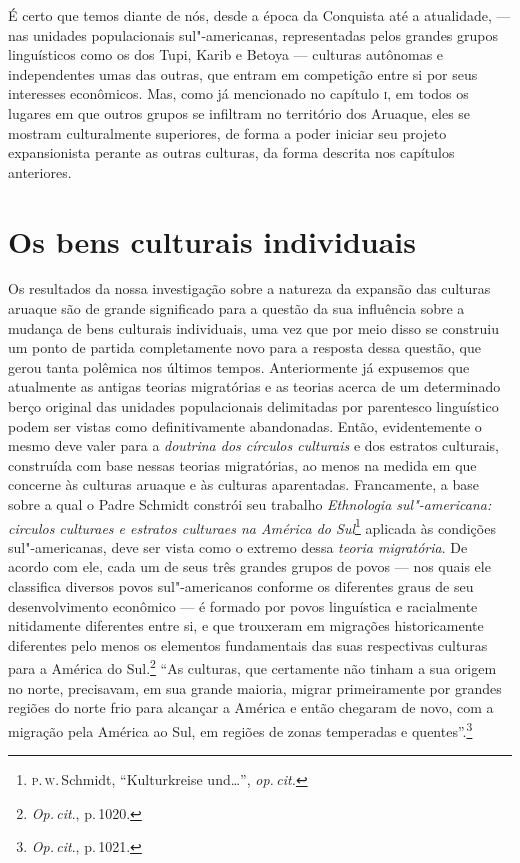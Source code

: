 É certo que temos diante de nós, desde a época da Conquista até a atualidade,
--- nas unidades populacionais sul"-americanas, representadas pelos
grandes grupos linguísticos como os dos Tupi, Karib e Betoya --- culturas
autônomas e independentes umas das outras, que entram em competição
entre si por seus interesses econômicos. Mas,
como já mencionado no capítulo \textsc{i}, em todos os lugares em que outros
grupos se infiltram no território dos Aruaque, eles se mostram
culturalmente superiores, de forma a poder iniciar seu projeto
expansionista perante as outras culturas, da forma descrita nos
capítulos anteriores.

\chapter*{Os bens culturais individuais\smallskip{}}


Os resultados da nossa investigação sobre a natureza da expansão das
culturas aruaque são de grande significado para a questão da sua
influência sobre a mudança de bens culturais individuais, uma vez que
por meio disso se construiu um ponto de partida completamente novo para
a resposta dessa questão, que gerou tanta polêmica nos últimos tempos.
Anteriormente já expusemos que atualmente as antigas teorias migratórias
e as teorias acerca de um determinado berço original das unidades
populacionais delimitadas por parentesco linguístico podem ser vistas
como definitivamente abandonadas. Então, evidentemente o mesmo deve
valer para a \textit{doutrina dos círculos culturais} e dos estratos culturais,
construída com base nessas teorias migratórias, ao menos na medida em
que concerne às culturas aruaque e às culturas aparentadas. Francamente,
a base sobre a qual o Padre Schmidt constrói seu trabalho \textit{Ethnologia sul"-americana: circulos
  culturaes e estratos culturaes na América do Sul}\footnote{\textsc{p}.\,\textsc{w}.\,Schmidt, ``Kulturkreise und\ldots'', \textit{op.\,cit.}} aplicada às condições sul"-americanas, deve ser vista como
o extremo dessa \textit{teoria migratória}. De acordo com ele, cada um de seus
três grandes grupos de povos --- nos quais ele classifica diversos povos
sul"-americanos conforme os diferentes graus de seu desenvolvimento
econômico --- é formado por povos linguística e racialmente nitidamente
diferentes entre si, e que trouxeram em migrações historicamente
diferentes pelo menos os elementos fundamentais das suas respectivas
culturas para a América do Sul.\footnote{\textit{Op.\,cit}., p.\,1020.} ``As
culturas, que certamente não tinham a sua origem no norte, precisavam,
em sua grande maioria, migrar primeiramente por grandes regiões do
norte frio para alcançar a América e então chegaram de novo, com a
migração pela América ao Sul, em regiões de zonas temperadas e
quentes''.\footnote{\textit{Op.\,cit}., p.\,1021.}

